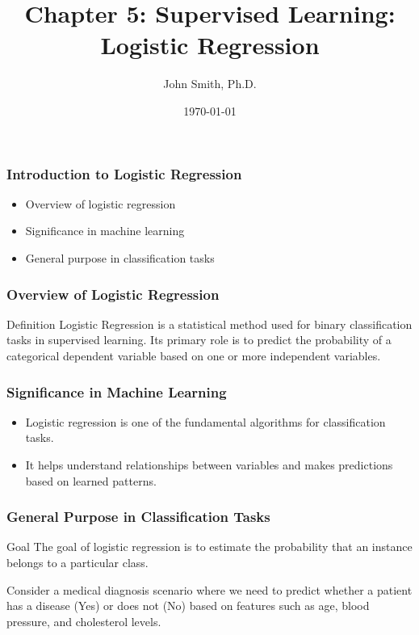 \documentclass[aspectratio=169]{beamer}
\title[Supervised Learning: Logistic Regression]{Chapter 5: Supervised Learning: Logistic Regression}
\author[J. Smith]{John Smith, Ph.D.}
\institute[University Name]{
  Department of Computer Science\\
  University Name\\
  \vspace{0.3cm}
  Email: email@university.edu\\
  Website: www.university.edu
}
\date{\today}
\begin{document}
\frame{\titlepage}

\begin{frame}[fragile]
    \frametitle{Introduction to Logistic Regression}
    \begin{itemize}
        \item Overview of logistic regression
        \item Significance in machine learning
        \item General purpose in classification tasks
    \end{itemize}
\end{frame}

\begin{frame}[fragile]
    \frametitle{Overview of Logistic Regression}
    \begin{block}{Definition}
        Logistic Regression is a statistical method used for binary classification tasks in supervised learning. Its primary role is to predict the probability of a categorical dependent variable based on one or more independent variables.
    \end{block}
\end{frame}

\begin{frame}[fragile]
    \frametitle{Significance in Machine Learning}
    \begin{itemize}
        \item Logistic regression is one of the fundamental algorithms for classification tasks.
        \item It helps understand relationships between variables and makes predictions based on learned patterns.
    \end{itemize}
\end{frame}

\begin{frame}[fragile]
    \frametitle{General Purpose in Classification Tasks}
    \begin{block}{Goal}
        The goal of logistic regression is to estimate the probability that an instance belongs to a particular class.
    \end{block}
    \begin{example}
        Consider a medical diagnosis scenario where we need to predict whether a patient has a disease (Yes) or does not (No) based on features such as age, blood pressure, and cholesterol levels.
    \end{example}
\end{frame}
\end{document}
